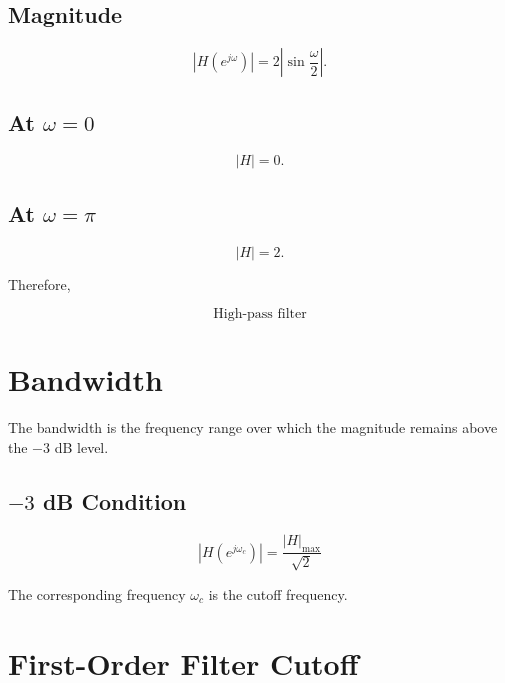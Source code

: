 \subsection{Magnitude}

\[
|H(e^{j\omega})|=
2\left|\sin\frac{\omega}{2}\right|.
\]


\subsection{At \(\omega=0\)}

\[
|H|=0.
\]


\subsection{At \(\omega=\pi\)}

\[
|H|=2.
\]

Therefore,

\[
\boxed{
\text{High-pass filter}
}
\]


\section{Bandwidth}

The bandwidth is the frequency range over which the magnitude remains above the
\(-3\) dB level.


\subsection{\(-3\) dB Condition}

\[
\boxed{
|H(e^{j\omega_c})|=
\frac{|H|_{\max}}{\sqrt{2}}
}
\]

The corresponding frequency \(\omega_c\) is the cutoff frequency.


\section{First-Order Filter Cutoff}

